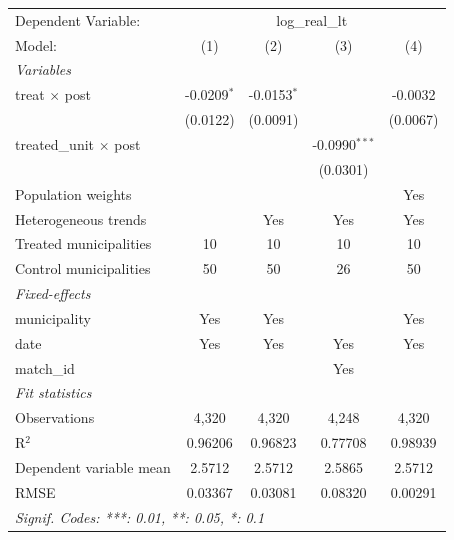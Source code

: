 
\begingroup
\centering
\begin{tabular}{lcccc}
   \tabularnewline \midrule \midrule
   Dependent Variable: & \multicolumn{4}{c}{log\_real\_lt}\\
   Model:                        & (1)           & (2)           & (3)             & (4)\\  
   \midrule
   \emph{Variables}\\
   treat $\times$ post           & -0.0209$^{*}$ & -0.0153$^{*}$ &                 & -0.0032\\   
                                 & (0.0122)      & (0.0091)      &                 & (0.0067)\\   
   treated\_unit $\times$ post   &               &               & -0.0990$^{***}$ &   \\   
                                 &               &               & (0.0301)        &   \\   
   Population weights            &               &               &                 & Yes\\  
   Heterogeneous trends          &               & Yes           & Yes             & Yes\\  
   Treated municipalities        & 10            & 10            & 10              & 10\\  
   Control municipalities        & 50            & 50            & 26              & 50\\  
   \midrule
   \emph{Fixed-effects}\\
   municipality                  & Yes           & Yes           &                 & Yes\\  
   date                          & Yes           & Yes           & Yes             & Yes\\  
   match\_id                     &               &               & Yes             & \\  
   \midrule
   \emph{Fit statistics}\\
   Observations                  & 4,320         & 4,320         & 4,248           & 4,320\\  
   R$^2$                         & 0.96206       & 0.96823       & 0.77708         & 0.98939\\  
   Dependent variable mean       & 2.5712        & 2.5712        & 2.5865          & 2.5712\\  
   RMSE                          & 0.03367       & 0.03081       & 0.08320         & 0.00291\\  
   \midrule \midrule
   \multicolumn{5}{l}{\emph{Signif. Codes: ***: 0.01, **: 0.05, *: 0.1}}\\
\end{tabular}
\par\endgroup


